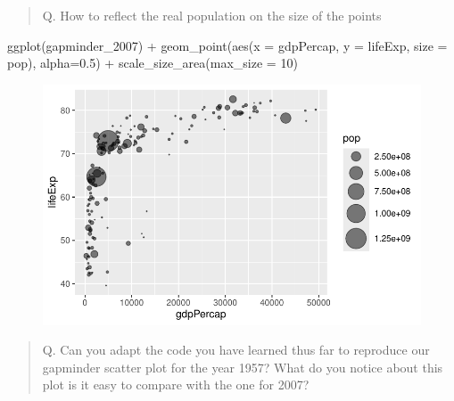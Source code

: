 \documentclass[
  letterpaper,
  DIV=11,
  numbers=noendperiod]{scrartcl}
\newenvironment{Shaded}{\begin{snugshade}}{\end{snugshade}}
\newcommand{\AttributeTok}[1]{\textcolor[rgb]{0.40,0.45,0.13}{#1}}
\newcommand{\DecValTok}[1]{\textcolor[rgb]{0.68,0.00,0.00}{#1}}
\newcommand{\FloatTok}[1]{\textcolor[rgb]{0.68,0.00,0.00}{#1}}
\newcommand{\FunctionTok}[1]{\textcolor[rgb]{0.28,0.35,0.67}{#1}}
\newcommand{\NormalTok}[1]{\textcolor[rgb]{0.00,0.23,0.31}{#1}}
\newcommand{\SpecialCharTok}[1]{\textcolor[rgb]{0.37,0.37,0.37}{#1}}
\begin{document}
\begin{quote}
Q. How to reflect the real population on the size of the points
\end{quote}

\begin{Shaded}
\begin{Highlighting}[]
\FunctionTok{ggplot}\NormalTok{(gapminder\_2007) }\SpecialCharTok{+} 
  \FunctionTok{geom\_point}\NormalTok{(}\FunctionTok{aes}\NormalTok{(}\AttributeTok{x =}\NormalTok{ gdpPercap, }\AttributeTok{y =}\NormalTok{ lifeExp,}
                 \AttributeTok{size =}\NormalTok{ pop), }\AttributeTok{alpha=}\FloatTok{0.5}\NormalTok{) }\SpecialCharTok{+} 
  \FunctionTok{scale\_size\_area}\NormalTok{(}\AttributeTok{max\_size =} \DecValTok{10}\NormalTok{)}
\end{Highlighting}
\end{Shaded}

\begin{figure}[H]

{\centering \includegraphics{class05_files/figure-pdf/unnamed-chunk-22-1.pdf}

}

\end{figure}

\begin{quote}
Q. Can you adapt the code you have learned thus far to reproduce our
gapminder scatter plot for the year 1957? What do you notice about this
plot is it easy to compare with the one for 2007?
\end{quote}
\end{document}

